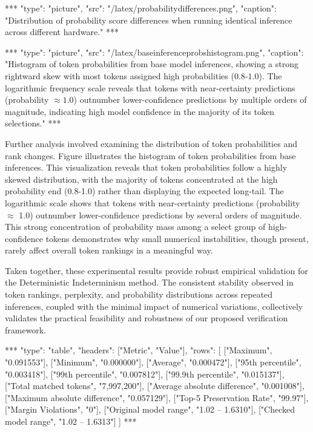 \documentclass{article}
\begin{document}
\begin{center}
***
"type": "picture",
"src": "/latex/probabilitydifferences.png",
"caption": "Distribution of probability score differences when running identical inference across different hardware."
***
\end{center}

\begin{center}
***
"type": "picture",
"src": "/latex/baseinferenceprobshistogram.png",
"caption": "Histogram of token probabilities from base model inferences, showing a strong rightward skew with most tokens assigned high probabilities ($0.8$-$1.0$). The logarithmic frequency scale reveals that tokens with near-certainty predictions (probability $\approx 1.0$) outnumber lower-confidence predictions by multiple orders of magnitude, indicating high model confidence in the majority of its token selections."
***
\end{center}

Further analysis involved examining the distribution of token probabilities and rank changes. Figure illustrates the histogram of token probabilities from base inferences. This visualization reveals that token probabilities follow a highly skewed distribution, with the majority of tokens concentrated at the high probability end (0.8-1.0) rather than displaying the expected long-tail. The logarithmic scale shows that tokens with near-certainty predictions (probability $\approx$ 1.0) outnumber lower-confidence predictions by several orders of magnitude. This strong concentration of probability mass among a select group of high-confidence tokens demonstrates why small numerical instabilities, though present, rarely affect overall token rankings in a meaningful way.

Taken together, these experimental results provide robust empirical validation for the Deterministic Indeterminism method.  The consistent stability observed in token rankings, perplexity, and probability distributions across repeated inferences, coupled with the minimal impact of numerical variations, collectively validates the practical feasibility and robustness of our proposed verification framework.

\begin{center}
***
"type": "table",
"headers": ["Metric", "Value"],
"rows": [
    ["Maximum", "0.091553"],
    ["Minimum", "0.000000"],
    ["Average", "0.000472"],
    ["95th percentile", "0.003418"],
    ["99th percentile", "0.007812"],
    ["99.9th percentile", "0.015137"],
    ["Total matched tokens", "7,997,200"],
    ["Average absolute difference", "0.001008"],
    ["Maximum absolute difference", "0.057129"],
    ["Top-5 Preservation Rate", "99.97"],
    ["Margin Violations", "0"],
    ["Original model range", "1.02 -- 1.6310"],
    ["Checked model range", "1.02 -- 1.6313"]
]
***
\end{center}
\end{document}
